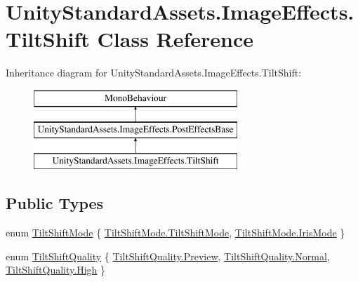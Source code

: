 \hypertarget{class_unity_standard_assets_1_1_image_effects_1_1_tilt_shift}{}\section{Unity\+Standard\+Assets.\+Image\+Effects.\+Tilt\+Shift Class Reference}
\label{class_unity_standard_assets_1_1_image_effects_1_1_tilt_shift}
Inheritance diagram for Unity\+Standard\+Assets.\+Image\+Effects.\+Tilt\+Shift\+:\begin{figure}[H]
\begin{center}
\leavevmode
\includegraphics[height=3.000000cm]{class_unity_standard_assets_1_1_image_effects_1_1_tilt_shift}
\end{center}
\end{figure}
\subsection*{Public Types}
\begin{DoxyCompactItemize}
\item 
enum \mbox{\hyperlink{class_unity_standard_assets_1_1_image_effects_1_1_tilt_shift_a30526c23a7fabb0f3b6e86e669fbeaae}{Tilt\+Shift\+Mode}} \{ \mbox{\hyperlink{class_unity_standard_assets_1_1_image_effects_1_1_tilt_shift_a30526c23a7fabb0f3b6e86e669fbeaaea6d0e5d7c0b9dd0bd373b188a1dee4a4e}{Tilt\+Shift\+Mode.\+Tilt\+Shift\+Mode}}, 
\mbox{\hyperlink{class_unity_standard_assets_1_1_image_effects_1_1_tilt_shift_a30526c23a7fabb0f3b6e86e669fbeaaea8c05d031369ac353a839e34ab10fd63e}{Tilt\+Shift\+Mode.\+Iris\+Mode}}
 \}
\item 
enum \mbox{\hyperlink{class_unity_standard_assets_1_1_image_effects_1_1_tilt_shift_a25a7f26cb8470a26a167c6d381489605}{Tilt\+Shift\+Quality}} \{ \mbox{\hyperlink{class_unity_standard_assets_1_1_image_effects_1_1_tilt_shift_a25a7f26cb8470a26a167c6d381489605a31fde7b05ac8952dacf4af8a704074ec}{Tilt\+Shift\+Quality.\+Preview}}, 
\mbox{\hyperlink{class_unity_standard_assets_1_1_image_effects_1_1_tilt_shift_a25a7f26cb8470a26a167c6d381489605a960b44c579bc2f6818d2daaf9e4c16f0}{Tilt\+Shift\+Quality.\+Normal}}, 
\mbox{\hyperlink{class_unity_standard_assets_1_1_image_effects_1_1_tilt_shift_a25a7f26cb8470a26a167c6d381489605a655d20c1ca69519ca647684edbb2db35}{Tilt\+Shift\+Quality.\+High}}
 \}
\end{DoxyCompactItemize}
